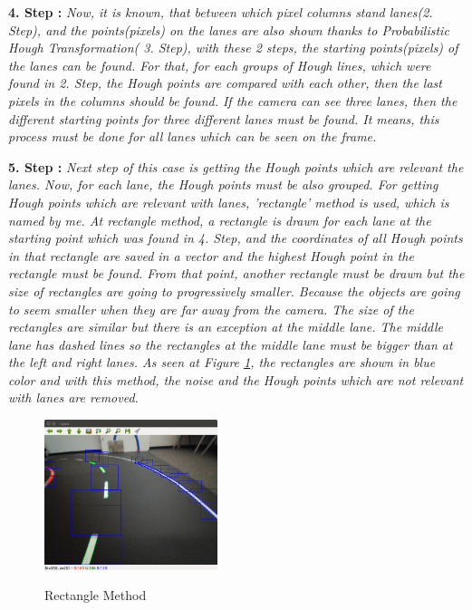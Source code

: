\textbf{4. Step : }\emph{\color{blue}Now, it is known, that between which pixel columns stand lanes(2. Step), and the points(pixels) on the lanes are also shown thanks to Probabilistic Hough Transformation( 3. Step), with these 2 steps, the starting points(pixels) of the lanes can be found. For that, for each groups of Hough lines, which were found in 2. Step, the Hough points are compared with each other, then the last pixels in the columns should be found. If the camera can see three lanes, then the different starting points for three different lanes must be found. It means, this process must be done for all lanes which can be seen on the frame.} 


\textbf{5. Step : }\emph{\color{blue}Next step of this case is getting the Hough points which are relevant the lanes. Now, for each lane, the Hough points must be also grouped. For getting Hough points which are relevant with lanes, 'rectangle' method is used, which is named by me. At rectangle method, a rectangle is drawn for each lane at the starting point which was found in 4. Step, and the coordinates of all Hough points in that rectangle are saved in a vector and the highest Hough point in the rectangle must be found. From that point, another rectangle must be drawn but the size of rectangles are going to progressively smaller. Because the objects are going to seem smaller when they are far away from the camera. The size of the rectangles are similar but there is an exception at the middle lane. The middle lane has dashed lines so the rectangles at the middle lane must be bigger than at the left and right lanes. As seen at Figure \ref{fig:Case1_Rectangles}, the rectangles are shown in blue color and with this method, the noise and the Hough points which are not relevant with lanes are removed.}


\begin{figure}[H]
 \centering
  \includegraphics[width=0.45\textwidth]{./Bilder/Case1_Rectangles.png}\label{fig:Case1_Rectangles}
	\caption{Rectangle Method}
\end{figure}


